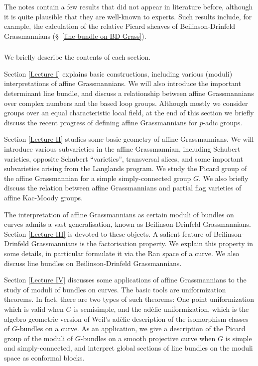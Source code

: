 \documentclass[]{pcmi}
\theoremstyle{plain}
\theoremstyle{remark}
\theoremstyle{definition}
\begin{document}
The notes contain a few results that did not appear in literature before, although it is quite plausible that they are well-known to experts. Such results include, for example, the calculation of the relative Picard sheaves of Beilinson-Drinfeld Grassmannians (\S\ \ref{line bundle on BD Grass}).

\subsubsection{}
We briefly describe the contents of each section.

Section \ref{Lecture I} explains basic constructions, including various (moduli) interpretations of affine Grassmannians. We will also introduce the important determinant line bundle, and discuss a relationship between affine Grassmannians over complex numbers and the based loop groups. Although mostly  we consider groups over an equal characteristic local field, at the end of this section we briefly discuss the recent progress of defining affine Grassmannians for  $p$-adic groups.

Section \ref{Lecture II} studies some basic geometry of affine Grassmannians. We will introduce various subvarieties in the affine Grassmannian, including Schubert varieties, opposite Schubert ``varieties'', transversal slices, and some important subvarieties arising from the Langlands program. We study the Picard group of the affine Grassmannian for a simple simply-connected group $G$.  We also briefly discuss the relation between affine Grassmannians and partial flag varieties of affine Kac-Moody groups.

The interpretation of affine Grassmannians as certain moduli of bundles on curves admits a vast generalisation, known as Beilinson-Drinfeld Grassmannians. Section \ref{Lecture III} is devoted to these objects. A salient feature of Beilinson-Drinfeld Grassmannians is the factorisation property. We explain this property in some details, in particular formulate it via the Ran space of a curve. We also discuss line bundles on Beilinson-Drinfeld Grassmannians.


Section \ref{Lecture IV} discusses some applications of affine Grassmannians to the study of moduli of bundles on curves. The basic tools are uniformization theorems. In fact, there are two types of such theorems: One point uniformization which is valid when $G$ is semisimple, and the ad\`elic uniformization, which is the algebro-geometric version of Weil's ad\`elic description of the isomorphism classes of $G$-bundles on a curve.  As an application, we give a description of the Picard group of the moduli of $G$-bundles on a smooth projective curve when $G$ is simple and simply-connected, and interpret global sections of line bundles on the moduli space as conformal blocks.
\end{document}
